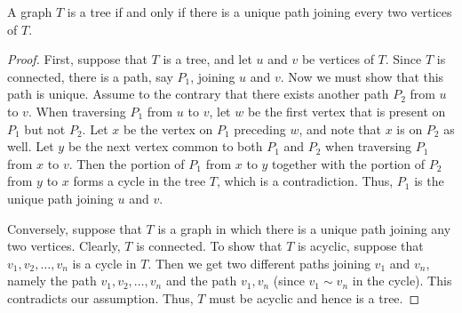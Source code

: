 \begin{Theorem}\label{thm:UniPath}
A graph $T$ is a tree if and only if there is a unique path joining every two vertices of $T$.
\end{Theorem}
\begin{proof}
First, suppose that $T$ is a tree, and let $u$ and $v$ be vertices of $T$. Since $T$ is connected, there is a path, say $P_1$, joining $u$ and $v$. Now we must show that this path is unique. Assume to the contrary that there exists another path $P_2$ from $u$ to $v$. When traversing $P_1$ from $u$ to $v$, let $w$ be the first vertex that is present on $P_1$ but not $P_2$. Let $x$ be the vertex on $P_1$ preceding $w$, and note that $x$ is on $P_2$ as well. Let $y$ be the next vertex common to both $P_1$ and $P_2$ when traversing $P_1$ from $x$ to $v$. Then the portion of $P_1$ from $x$ to $y$ together with the portion of $P_2$ from $y$ to $x$ forms a cycle in the tree $T$, which is a contradiction. Thus, $P_1$ is the unique path joining $u$ and $v$.

Conversely, suppose that $T$ is a graph in which there is a unique path joining any two vertices. Clearly, $T$ is connected. To show that $T$ is acyclic, suppose that $v_1, v_2, \ldots, v_n$ is a cycle in $T$. Then we get two different paths joining $v_1$ and $v_n$, namely the path $v_1, v_2, \ldots, v_n$ and the path $v_1, v_n$ (since $v_1 \sim v_n$ in the cycle). This contradicts our assumption. Thus, $T$ must be acyclic and hence is a tree.
\end{proof}


